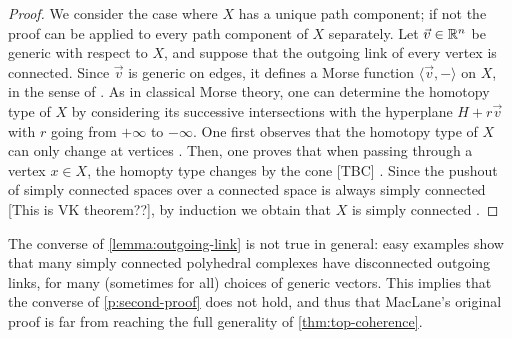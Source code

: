 \begin{proof}
    We consider the case where $X$ has a unique path component; if not the proof can be applied to every path component of $X$ separately. 
    Let $\vec v \in \mathbb R^n$ be generic with respect to $X$, and suppose that the outgoing link of every vertex is connected. 
    Since $\vec v$ is generic on edges, it defines a Morse function $\langle \vec v , -\rangle$ on $X$, in the sense of \cite[Definition 2.2]{bestvinaMorseTheoryFiniteness1997}.
    As in classical Morse theory, one can determine the homotopy type of $X$ by considering its successive intersections with the hyperplane $H + r\vec v$ with $r$ going from $+\infty$ to $-\infty$. 
    One first observes that the homotopy type of $X$ can only change at vertices  \cite[Lemma 2.3]{bestvinaMorseTheoryFiniteness1997}.
    Then, one proves that when passing through a vertex $x \in X$, the homopty type changes by the cone [TBC] \cite[Lemma 2.5]{bestvinaMorseTheoryFiniteness1997}.
    Since the pushout of simply connected spaces over a connected space is always simply connected [This is VK theorem??], by induction we obtain that $X$ is simply connected \cite[Point (3) of Corollary 2.6]{bestvinaMorseTheoryFiniteness1997}.
\end{proof}

The converse of \cref{lemma:outgoing-link} is not true in general: easy examples show that many simply connected polyhedral complexes have disconnected outgoing links, for many (sometimes for all) choices of generic vectors. 
This implies that the converse of \cref{p:second-proof} does not hold, and thus that MacLane's original proof is far from reaching the full generality of \cref{thm:top-coherence}.